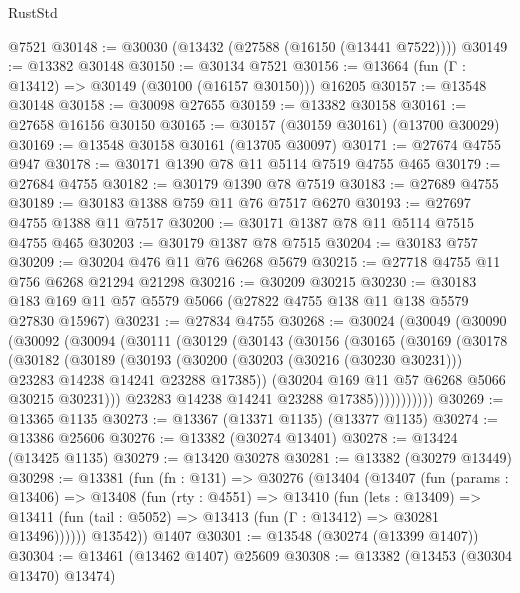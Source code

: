 \begin{lexlean}{RustStd}
\begin{coremodule}
    @7521
@30148 := @30030 (@13432 (@27588 (@16150 (@13441 @7522))))
@30149 := @13382 @30148
@30150 := @30134 @7521
@30156 := @13664 (fun (Γ : @13412) => @30149 (@30100 (@16157 @30150))) @16205
@30157 := @13548 @30148
@30158 := @30098 @27655
@30159 := @13382 @30158
@30161 := @27658 @16156 @30150
@30165 := @30157 (@30159 @30161) (@13700 @30029)
@30169 := @13548 @30158 @30161 (@13705 @30097)
@30171 := @27674 @4755 @947
@30178 := @30171 @1390 @78 @11 @5114 @7519 @4755 @465
@30179 := @27684 @4755
@30182 := @30179 @1390 @78 @7519
@30183 := @27689 @4755
@30189 := @30183 @1388 @759 @11 @76 @7517 @6270
@30193 := @27697 @4755 @1388 @11 @7517
@30200 := @30171 @1387 @78 @11 @5114 @7515 @4755 @465
@30203 := @30179 @1387 @78 @7515
@30204 := @30183 @757
@30209 := @30204 @476 @11 @76 @6268 @5679
@30215 := @27718 @4755 @11 @756 @6268 @21294 @21298
@30216 := @30209 @30215
@30230 := @30183 @183 @169 @11 @57 @5579 @5066 (@27822 @4755 @138 @11 @138 @5579 @27830 @15967)
@30231 := @27834 @4755
@30268 := @30024
    (@30049
      (@30090
        (@30092
          (@30094
            (@30111
              (@30129
                (@30143
                  (@30156
                    (@30165
                      (@30169
                        (@30178
                          (@30182
                            (@30189
                              (@30193
                                (@30200
                                  (@30203 (@30216 (@30230 @30231)))
                                  @23283
                                  @14238
                                  @14241
                                  @23288
                                  @17385))
                              (@30204 @169 @11 @57 @6268 @5066 @30215 @30231)))
                          @23283
                          @14238
                          @14241
                          @23288
                          @17385)))))))))))
@30269 := @13365 @1135
@30273 := @13367 (@13371 @1135) (@13377 @1135)
@30274 := @13386 @25606
@30276 := @13382 (@30274 @13401)
@30278 := @13424 (@13425 @1135)
@30279 := @13420 @30278
@30281 := @13382 (@30279 @13449)
@30298 := @13381
    (fun (fn : @131) =>
    @30276
      (@13404
        (@13407
          (fun (params : @13406) =>
          @13408
            (fun (rty : @4551) =>
            @13410
              (fun (lets : @13409) =>
              @13411 (fun (tail : @5052) => @13413 (fun (Γ : @13412) => @30281 @13496))))))
        @13542))
    @1407
@30301 := @13548 (@30274 (@13399 @1407))
@30304 := @13461 (@13462 @1407) @25609
@30308 := @13382 (@13453 (@30304 @13470) @13474)

\end{coremodule}
\end{lexlean}

